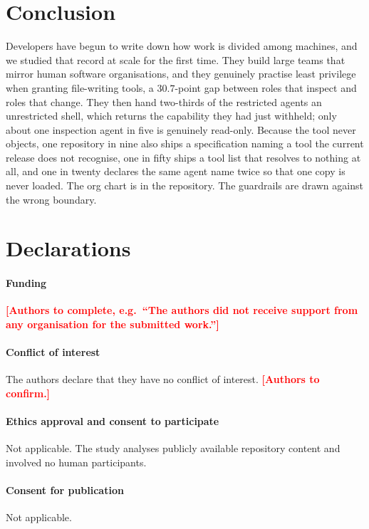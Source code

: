 \documentclass[smallextended,natbib]{svjour3}
\newcommand{\authornote}[1]{\textcolor{red}{\textbf{[#1]}}}
\begin{document}
\section{Conclusion}
\label{sec:conclusion}

Developers have begun to write down how work is divided among machines, and we studied that record at
scale for the first time. They build large teams that mirror human software organisations, and they
genuinely practise least privilege when granting file-writing tools, a $30.7$-point gap between
roles that inspect and roles that change. They then hand two-thirds of the restricted agents an
unrestricted shell, which returns the capability they had just withheld; only about one inspection
agent in five is genuinely read-only. Because the tool never objects, one repository in nine also
ships a specification naming a tool the current release does not recognise, one in fifty ships a
tool list that resolves to nothing at all, and one in twenty declares the same agent name twice so
that one copy is never loaded. The org chart is in the repository. The guardrails are drawn against
the wrong boundary.

\section*{Declarations}

\paragraph{Funding}
\authornote{Authors to complete, e.g.\ ``The authors did not receive support from any organisation
for the submitted work.''}

\paragraph{Conflict of interest}
The authors declare that they have no conflict of interest. \authornote{Authors to confirm.}

\paragraph{Ethics approval and consent to participate}
Not applicable. The study analyses publicly available repository content and involved no human
participants.

\paragraph{Consent for publication}
Not applicable.
\end{document}
